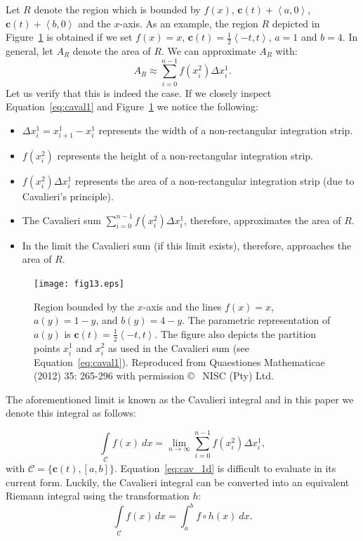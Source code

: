 \documentclass{article}
\theoremstyle{theorem}
\theoremstyle{definition}
\begin{document}
\noindent
Let $R$ denote the region which is bounded by $f(x)$, $\mathbf{c}(t)+\left <a,0\right >$, $\mathbf{c}(t)+\left <b,0\right >$ and the $x$-axis. 
As an example, the region $R$ depicted in Figure~\ref{fig:caval2} is obtained if we set $f(x) = x$, $\mathbf{c}(t) = \frac{1}{2}\left<- t, t\right>$, $a = 1$ and $b = 4$.
In general, let $A_R$ denote the area of $R$. We can approximate $A_R$ with:
\begin{equation}
 \label{eq:caval1}
 A_R \approx \sum_{i=0}^{n-1} f(x_i^2)\Delta x_i^1.
 \end{equation}
Let us verify that this is indeed the case. If we closely inspect Equation~\ref{eq:caval1} and Figure~\ref{fig:caval2} we notice the following:
 \begin{itemize}
  \item $\Delta x_i^1 = x_{i+1}^1 - x_i^1$ represents the width of a non-rectangular integration strip.
  \item $f(x_i^2)$ represents the height of a non-rectangular integration strip.
  \item $f(x_i^2)\Delta x_i^1$ represents the area of a non-rectangular integration strip (due to Cavalieri's principle).
  \item The Cavalieri sum $\sum_{i=0}^{n-1} f(x_i^2)\Delta x_i^1$, therefore, approximates the area of $R$.
  \item In the limit the Cavalieri sum (if this limit exists), therefore, approaches the area of $R$.
 \end{itemize}

\begin{figure}[htb]
\centering
\texttt{[image: fig13.eps]}
\caption{Region bounded by the $x$-axis and the lines $f(x)=x$, $a(y)=1-y$, and $b(y)=4-y$. The parametric representation of $a(y)$ is $\mathbf{c}(t) = \frac{1}{2} \left <-t,t \right >$. The figure also depicts the partition points $x_i^1$ and $x_i^2$ as used in the Cavalieri sum (see Equation~\eqref{eq:caval1}). Reproduced from Quaestiones Mathematicae (2012) 35: 265-296 with permission \copyright~ NISC (Pty) Ltd.}
\label{fig:caval2}
\end{figure}

\noindent
The aforementioned limit is known as the Cavalieri integral and in this paper we denote this integral as follows:

\begin{equation}
\label{eq:cav_1d}
\int \limits_{\mathcal{C}} f(x)~dx = \lim_{n \rightarrow \infty}  \sum_{i=0}^{n-1} f(x_i^2) \Delta x_i^1,
\end{equation}
with $\mathcal{C} = \{\mathbf{c}(t),[a,b]\}$. Equation~\eqref{eq:cav_1d} is difficult to evaluate in its current form. Luckily, the Cavalieri integral 
can be converted into an equivalent Riemann integral using the transformation $h$:
 \begin{equation}
 \int \limits_{\mathcal{C}} f(x)\, dx = \int_{a}^{b} f\circ h(x)~dx. \nonumber
\end{equation}
\end{document}

